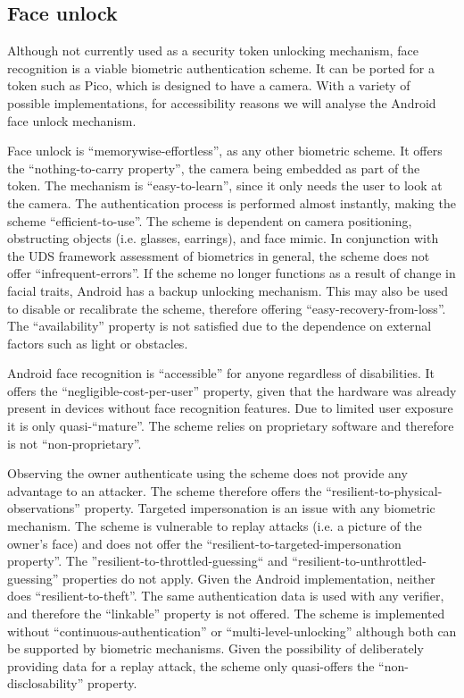 	\subsection{Face unlock}
	Although not currently used as a security token unlocking mechanism, face recognition is a viable biometric authentication scheme. It can be ported for a token such as Pico, which is designed to have a camera. With a variety of possible implementations, for accessibility reasons we will analyse the Android face unlock mechanism.
	
	Face unlock is ``memorywise-effortless'', as any other biometric scheme. It offers the ``nothing-to-carry property'', the camera being embedded as part of the token. The mechanism is ``easy-to-learn'', since it only needs the user to look at the camera. The authentication process is performed almost instantly, making the scheme ``efficient-to-use''. The scheme is dependent on camera positioning, obstructing objects (i.e. glasses, earrings), and face mimic. In conjunction with the UDS framework assessment of biometrics in general, the scheme does not offer ``infrequent-errors''. If the scheme no longer functions as a result of change in facial traits, Android has a backup unlocking mechanism. This may also be used to disable or recalibrate the scheme, therefore offering ``easy-recovery-from-loss''. The ``availability'' property is not satisfied due to the dependence on external factors such as light or obstacles.
	
	Android face recognition is ``accessible'' for anyone regardless of disabilities. It offers the ``negligible-cost-per-user'' property, given that the hardware was already present in devices without face recognition features. Due to limited user exposure it is only quasi-``mature''. The scheme relies on proprietary software and therefore is not ``non-proprietary''.
	
	Observing the owner authenticate using the scheme does not provide any advantage to an attacker. The scheme therefore offers the ``resilient-to-physical-observations'' property. Targeted impersonation is an issue with any biometric mechanism. The scheme is vulnerable to replay attacks (i.e. a picture of the owner's face) and does not offer the ``resilient-to-targeted-impersonation property''. The ''resilient-to-throttled-guessing`` and ``resilient-to-unthrottled-guessing'' properties do not apply. Given the Android implementation, neither does ``resilient-to-theft''. The same authentication data is used with any verifier, and therefore the ``linkable'' property is not offered. The scheme is implemented without ``continuous-authentication'' or ``multi-level-unlocking'' although both can be supported by biometric mechanisms. Given the possibility of deliberately providing data for a replay attack, the scheme only quasi-offers the ``non-disclosability'' property.

